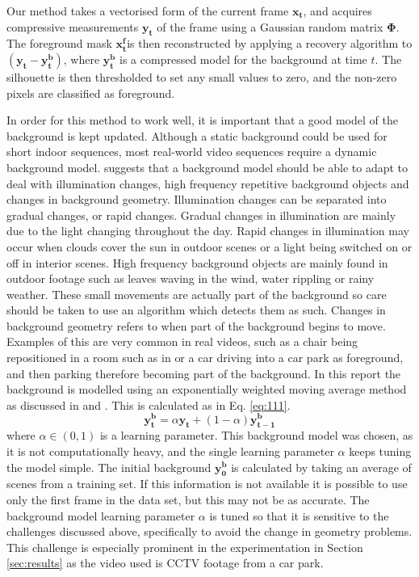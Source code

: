 Our method takes a vectorised form of the current frame $\boldsymbol{x_t}$, and acquires compressive measurements $\boldsymbol{y_t}$ of the frame using a Gaussian random matrix $\boldsymbol{\Phi}$. The foreground mask $\boldsymbol{x_t^f} $is then reconstructed by applying a recovery algorithm  to $(\boldsymbol{y_t} - \boldsymbol{y_t^b})$, where $\boldsymbol{y_t^b}$ is a compressed model for the background at time $t$. The silhouette is then thresholded to set any small values to zero, and the non-zero pixels are classified as foreground. 

In order for this method to work well, it is important that a good model of the background is kept updated. Although a static background could be used for short indoor sequences, most real-world video sequences require a dynamic background model. \cite{Piccardi2004a} suggests that a background model should be able to adapt to deal with illumination changes, high frequency repetitive background objects and changes in background geometry. Illumination changes can be separated into gradual changes, or rapid changes. Gradual changes in illumination are mainly due to the light changing throughout the day. Rapid changes in illumination may occur when clouds cover the sun in outdoor scenes or a light being switched on or off in interior scenes. High frequency background objects are mainly found in outdoor footage such as leaves waving in the wind, water rippling or rainy weather. These small movements are actually part of the background so care should be taken to use an algorithm which detects them as such.  Changes in background geometry refers to when part of the background begins to move. Examples of this are very common in real videos, such as a chair being repositioned in a room such as in \cite{toyama1999} or a car driving into a car park as foreground, and then parking therefore becoming part of the background. In this report the background is modelled using an exponentially weighted moving average method as discussed in \cite{Piccardi2004a} and \cite{Cossalter2009}. This is calculated as in Eq. \eqref{eq:111}.
\begin{equation}
  \label{eq:111}
  \boldsymbol{y_t^b} = \alpha \boldsymbol{y_t} + (1 - \alpha) \boldsymbol{y^b_{t-1}}
\end{equation}
 where $\alpha \in (0,1)$ is a learning parameter.
This background model was chosen, as it is not computationally heavy, and the single learning parameter $\alpha$ keeps tuning the model simple. The initial background $\boldsymbol{y^b_0}$ is calculated by taking an average of scenes from a training set. If this information is not available it is possible to use only the first frame in the data set, but this may not be as accurate. The background model learning parameter $\alpha$ is tuned so that it is sensitive to the challenges discussed above, specifically to avoid the change in geometry problems. This challenge is especially prominent in the experimentation in Section \ref{sec:results} as the video used is CCTV footage from a car park.   

